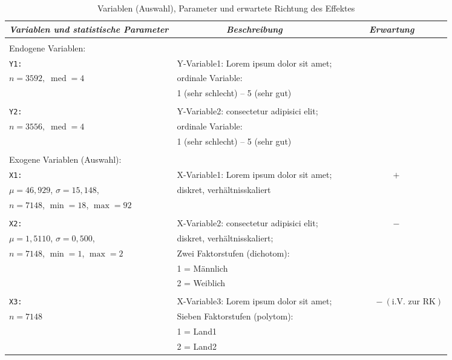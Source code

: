 \documentclass[12pt, a4paper, oneside]{article}
\begin{document}
\begin{table}[!htbp] \centering 
	\footnotesize 
  \caption{Variablen (Auswahl), Parameter und erwartete Richtung des Effektes} 
  \label{descriptive} 
\begin{tabularx}{\columnwidth}{XXl}
\hline\hline 
\multicolumn{1}{l}{\emph{Variablen und statistische Parameter}}  & \multicolumn{1}{c}{\emph{Beschreibung}} & \multicolumn{1}{c}{\emph{Erwartung}} \\ 
\hline \\[-1.8ex]
Endogene Variablen:\\
\hline
\hline 
\texttt{Y1:}  & Y-Variable1: Lorem ipsum dolor sit amet;  &  \\
 $n=3592, \;\operatorname{med}=4$  &ordinale Variable:&\\
 &1 (sehr schlecht) -- 5 (sehr gut)&\\
  \\
  \hline
\texttt{Y2:}  & Y-Variable2: consectetur adipisici elit;   &  \\
 $n=3556 , \;\operatorname{med}=4$ &ordinale Variable:&\\
 &1 (sehr schlecht) -- 5 (sehr gut)&\\
\\
\hline
\hline
Exogene Variablen (Auswahl):\\
\hline
\hline
\texttt{X1:}  & X-Variable1: Lorem ipsum dolor sit amet;  & $\qquad \qquad  \qquad  +$\\
$\mu=46{,}929$, $\sigma=15{,}148$, & diskret, verhältnisskaliert &\\
$n=7148$, $\operatorname{min}=18$, $\operatorname{max}=92$ &&\\
\\
\hline
\texttt{X2:}  & X-Variable2: consectetur adipisici elit;  & $\qquad \qquad  \qquad  -$ \\
$\mu=1{,}5110$, $\sigma= 0{,}500$,  & diskret, verhältnisskaliert; &\\ 
$n=7148$, $\operatorname{min}=1$, $\operatorname{max}=2$ & Zwei Faktorstufen (dichotom): &\\
& 1 = Männlich &\\
& 2 = Weiblich &\\
\\
\hline
\texttt{X3:} & X-Variable3: Lorem ipsum dolor sit amet; & $\qquad \qquad  - (\text{i.V. zur RK} )$ \\
$n=7148$ & Sieben Faktorstufen (polytom): &\\ 
& 1 = Land1 &\\
& 2 = Land2 &\\

\end{tabularx}
\end{table}
\end{document}
